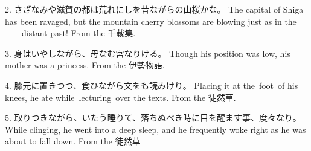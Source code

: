 \par{2. さざなみや滋賀の都は荒れにしを昔ながらの山桜かな。 \hfill\break
The capital of Shiga has been ravaged, but the mountain cherry blossoms are blowing just as in the 　　distant past! \hfill\break
From the 千載集. }

\par{3. 身はいやしながら、母なむ宮なりける。 \hfill\break
Though his position was low, his mother was a princess. \hfill\break
From the 伊勢物語. }

\par{4. 膝元に置きつつ、食ひながら文をも読みけり。 \hfill\break
Placing it at the foot of his knees, he ate while lecturing over the texts. \hfill\break
From the 徒然草. }

\par{5. 取りつきながら、いたう睡りて、落ちぬべき時に目を醒ます事、度々なり。 \hfill\break
While clinging, he went into a deep sleep, and he frequently woke right as he was about to fall down. \hfill\break
From the 徒然草 }
    